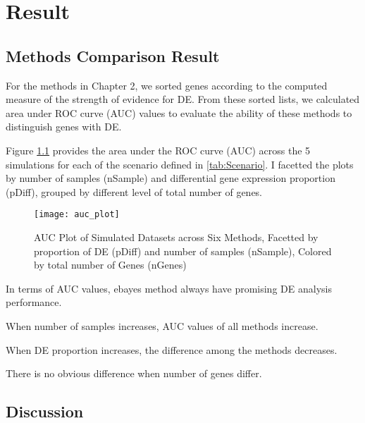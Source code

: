 \chapter{Result}

\section{Methods Comparison Result}

For the methods in Chapter 2, we sorted genes according to the computed measure of the strength of evidence for DE. From these sorted lists, we calculated area under ROC curve (AUC) values to evaluate the ability of these methods to distinguish genes with DE. 

Figure \ref{auc} provides the area under the ROC curve (AUC) across the 5 simulations for each of the scenario defined in \ref{tab:Scenario}. I facetted the plots by number of samples (nSample) and differential gene expression proportion (pDiff), grouped by different level of total number of genes. 

\begin{figure}[h!tb] 
\texttt{[image: auc\_plot]}
\caption{AUC Plot of Simulated Datasets across Six Methods, Facetted by proportion of DE (pDiff) and number of samples (nSample), Colored by total number of Genes (nGenes)}
\label{auc}
\end{figure}

In terms of AUC values, ebayes method always have promising DE analysis performance.

When number of samples increases, AUC values of all methods increase. 

When DE proportion increases, the difference among the methods decreases. 

There is no obvious difference when number of genes differ.


\section{Discussion}






